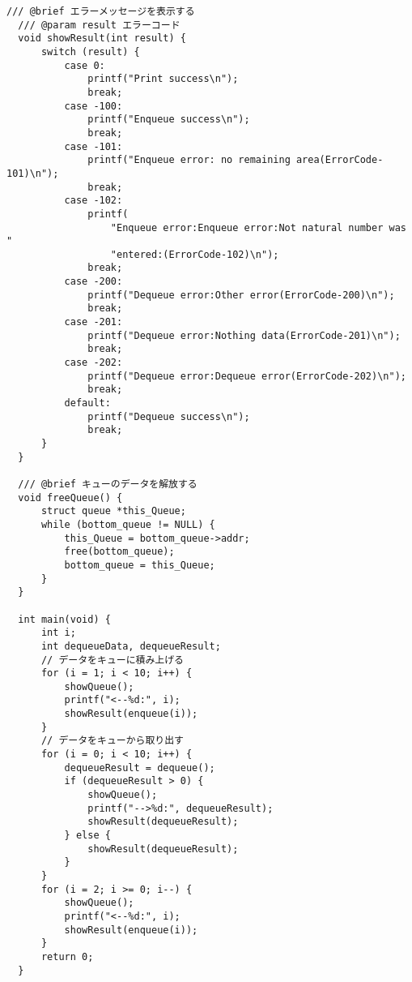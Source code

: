 \documentclass[a4j]{jarticle}
\begin{document}
\begin{lstlisting}[caption=リストキューのプログラム,label=listqueue]
  /// @brief エラーメッセージを表示する
  /// @param result エラーコード
  void showResult(int result) {
      switch (result) {
          case 0:
              printf("Print success\n");
              break;
          case -100:
              printf("Enqueue success\n");
              break;
          case -101:
              printf("Enqueue error: no remaining area(ErrorCode-101)\n");
              break;
          case -102:
              printf(
                  "Enqueue error:Enqueue error:Not natural number was "
                  "entered:(ErrorCode-102)\n");
              break;
          case -200:
              printf("Dequeue error:Other error(ErrorCode-200)\n");
              break;
          case -201:
              printf("Dequeue error:Nothing data(ErrorCode-201)\n");
              break;
          case -202:
              printf("Dequeue error:Dequeue error(ErrorCode-202)\n");
              break;
          default:
              printf("Dequeue success\n");
              break;
      }
  }
  
  /// @brief キューのデータを解放する
  void freeQueue() {
      struct queue *this_Queue;
      while (bottom_queue != NULL) {
          this_Queue = bottom_queue->addr;
          free(bottom_queue);
          bottom_queue = this_Queue;
      }
  }
  
  int main(void) {
      int i;
      int dequeueData, dequeueResult;
      // データをキューに積み上げる
      for (i = 1; i < 10; i++) {
          showQueue();
          printf("<--%d:", i);
          showResult(enqueue(i));
      }
      // データをキューから取り出す
      for (i = 0; i < 10; i++) {
          dequeueResult = dequeue();
          if (dequeueResult > 0) {
              showQueue();
              printf("-->%d:", dequeueResult);
              showResult(dequeueResult);
          } else {
              showResult(dequeueResult);
          }
      }
      for (i = 2; i >= 0; i--) {
          showQueue();
          printf("<--%d:", i);
          showResult(enqueue(i));
      }
      return 0;
  }
\end{lstlisting}
\end{document}
